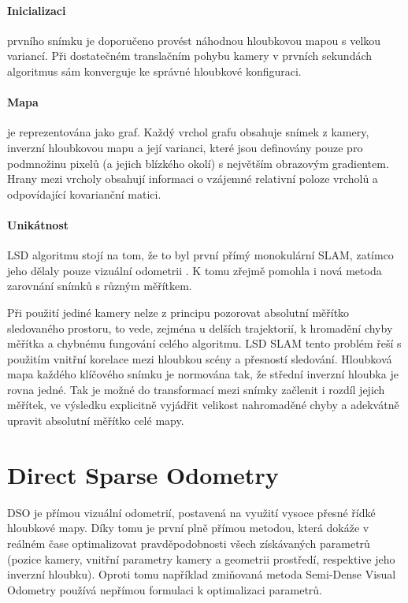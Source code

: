 \documentclass[12pt,a4paper]{report}
\begin{document}
\paragraph{Inicializaci} prvního snímku je doporučeno provést náhodnou hloubkovou mapou s velkou variancí. Při dostatečném translačním pohybu kamery v prvních sekundách algoritmus sám konverguje ke správné hloubkové konfiguraci.

\paragraph{Mapa} je reprezentována jako graf. Každý vrchol grafu obsahuje snímek z kamery, inverzní hloubkovou mapu a její varianci, které jsou definovány pouze pro podmnožinu pixelů (a jejich blízkého okolí) s největším obrazovým gradientem. Hrany mezi vrcholy obsahují informaci o vzájemné relativní poloze vrcholů a odpovídající kovarianční matici.

\paragraph{Unikátnost} LSD algoritmu stojí na tom, že to byl první přímý monokulární SLAM, zatímco jeho  dělaly pouze vizuální odometrii \cite{Engel14_LSD}. K tomu zřejmě pomohla i nová metoda zarovnání snímků s různým měřítkem. 

Při použití jediné kamery nelze z principu pozorovat absolutní měřítko sledovaného prostoru, to vede, zejména u delších trajektorií, k hromadění chyby měřítka a chybnému fungování celého algoritmu. LSD SLAM tento problém řeší s použitím vnitřní korelace mezi hloubkou scény a přesností sledování. Hloubková mapa každého klíčového snímku je normována tak, že střední inverzní hloubka je rovna jedné. Tak je možné do transformací mezi snímky začlenit i rozdíl jejich měřítek, ve výsledku explicitně vyjádřit velikost nahromaděné chyby a adekvátně upravit absolutní měřítko celé mapy.

\section{Direct Sparse Odometry}
DSO je přímou vizuální odometrií, postavená na využití vysoce přesné řídké hloubkové mapy. Díky tomu je první plně přímou metodou, která dokáže v reálném čase optimalizovat pravděpodobnosti všech získávaných parametrů (pozice kamery, vnitřní parametry kamery a geometrii prostředí, respektive jeho inverzní hloubku). Oproti tomu například zmiňovaná metoda Semi-Dense Visual Odometry používá nepřímou formulaci k optimalizaci parametrů.
\end{document}
